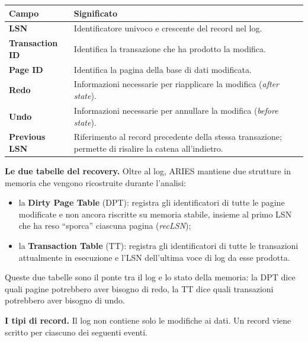 \documentclass[12pt]{extarticle}
\begin{document}
\begin{center}
\small
\begin{tabular}{@{}lp{10.4cm}@{}}
    \toprule
    \textbf{Campo} & \textbf{Significato} \\
    \midrule
    \textbf{LSN} & Identificatore univoco e crescente del record nel log. \\
    \addlinespace
    \textbf{Transaction ID} & Identifica la transazione che ha prodotto la modifica. \\
    \addlinespace
    \textbf{Page ID} & Identifica la pagina della base di dati modificata. \\
    \addlinespace
    \textbf{Redo} & Informazioni necessarie per riapplicare la modifica (\textit{after state}). \\
    \addlinespace
    \textbf{Undo} & Informazioni necessarie per annullare la modifica (\textit{before state}). \\
    \addlinespace
    \textbf{Previous LSN} & Riferimento al record precedente della stessa transazione; permette di risalire la catena all'indietro. \\
    \bottomrule
\end{tabular}
\end{center}

\medskip
\noindent \textbf{Le due tabelle del recovery.} Oltre al log, ARIES mantiene due strutture in memoria che vengono ricostruite durante l'analisi:
\begin{itemize}
    \item la \textbf{Dirty Page Table} (DPT): registra gli identificatori di tutte le pagine modificate e non ancora riscritte su memoria stabile, insieme al primo LSN che ha reso ``sporca'' ciascuna pagina (\textit{recLSN});
    \item la \textbf{Transaction Table} (TT): registra gli identificatori di tutte le transazioni attualmente in esecuzione e l'LSN dell'ultima voce di log da esse prodotta.
\end{itemize}
Queste due tabelle sono il ponte tra il log e lo stato della memoria: la DPT dice quali pagine potrebbero aver bisogno di redo, la TT dice quali transazioni potrebbero aver bisogno di undo.

\medskip
\noindent \textbf{I tipi di record.} Il log non contiene solo le modifiche ai dati. Un record viene scritto per ciascuno dei seguenti eventi.
\end{document}
